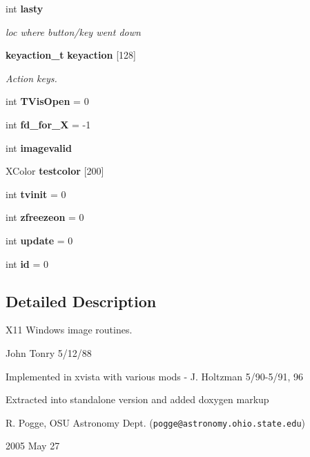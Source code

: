 \begin{CompactItemize}
\item 
int {\bf lasty}\label{xtvutils_8c_a153}

\begin{CompactList}\small\item\em loc where button/key went down \item\end{CompactList}\item 
{\bf keyaction\_\-t} {\bf keyaction} [128]\label{xtvutils_8c_a154}

\begin{CompactList}\small\item\em Action keys. \item\end{CompactList}\item 
int {\bf TVis\-Open} = 0\label{xtvutils_8c_a155}

\item 
int {\bf fd\_\-for\_\-X} = -1\label{xtvutils_8c_a156}

\item 
int {\bf imagevalid}\label{xtvutils_8c_a157}

\item 
XColor {\bf testcolor} [200]\label{xtvutils_8c_a158}

\item 
int {\bf tvinit} = 0\label{xtvutils_8c_a159}

\item 
int {\bf zfreezeon} = 0\label{xtvutils_8c_a160}

\item 
int {\bf update} = 0\label{xtvutils_8c_a161}

\item 
int {\bf id} = 0\label{xtvutils_8c_a163}

\end{CompactItemize}


\subsection{Detailed Description}
X11 Windows image routines. 

\begin{Desc}
\item[Author:]John Tonry 5/12/88\end{Desc}
Implemented in xvista with various mods - J. Holtzman 5/90-5/91, 96

Extracted into standalone version and added doxygen markup\par
 R. Pogge, OSU Astronomy Dept. ({\tt pogge@astronomy.ohio.state.edu})\par
 2005 May 27

